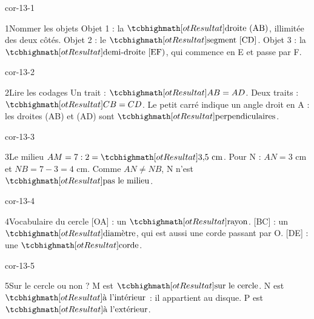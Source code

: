 \clearpage\pagestyle{otMain}\setlength{\otBlocEspacement}{2.5mm}\fontsize{11}{15}\selectfont{}
\begin{blocLivre}{cor-13-1}\begin{corrige}{1}{Nommer les objets}
Objet 1 : la $\res{\text{droite (AB)}}$, illimitée des deux côtés. Objet 2 : le $\res{\text{segment [CD]}}$. Objet 3 : la $\res{\text{demi-droite [EF)}}$, qui commence en E et passe par F.
\label{fig-cor-13-1}
\end{corrige}\end{blocLivre}
\begin{blocLivre}{cor-13-2}\begin{corrige}{2}{Lire les codages}
Un trait : $\res{AB=AD}$. Deux traits : $\res{CB=CD}$. Le petit carré indique un angle droit en A : les droites (AB) et (AD) sont $\res{\text{perpendiculaires}}$.
\label{fig-cor-13-2}
\end{corrige}\end{blocLivre}
\begin{blocLivre}{cor-13-3}\begin{corrige}{3}{Le milieu}
$AM=7:2=\res{3{,}5\ \mathrm{cm}}$. Pour N : $AN=3$ cm et $NB=7-3=4$ cm. Comme $AN\ne NB$, N n’est $\res{\text{pas le milieu}}$.
\label{fig-cor-13-3}
\end{corrige}\end{blocLivre}
\begin{blocLivre}{cor-13-4}\begin{corrige}{4}{Vocabulaire du cercle}
[OA] : un $\res{\text{rayon}}$. [BC] : un $\res{\text{diamètre}}$, qui est aussi une corde passant par O. [DE] : une $\res{\text{corde}}$.
\label{fig-cor-13-4}
\end{corrige}\end{blocLivre}
\begin{blocLivre}{cor-13-5}\begin{corrige}{5}{Sur le cercle ou non ?}
M est $\res{\text{sur le cercle}}$. N est $\res{\text{à l’intérieur}}$ : il appartient au disque. P est $\res{\text{à l’extérieur}}$.
\label{fig-cor-13-5}
\end{corrige}\end{blocLivre}
